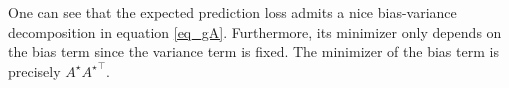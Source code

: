 	 One can see that the expected prediction loss admits a nice bias-variance decomposition in equation \eqref{eq_gA}.
	Furthermore, its minimizer only depends on the bias term since the variance term is fixed.
	The minimizer of the bias term is precisely $A^{\star} {A^{\star}}^{\top}$.

